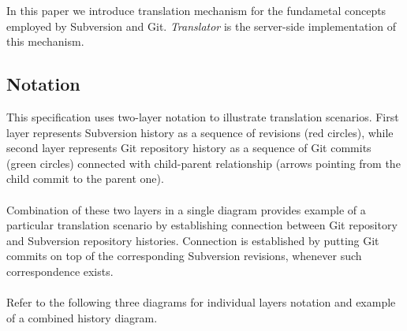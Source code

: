 \renewcommand{\figurename}{Diagram}
In this paper we introduce translation mechanism for the fundametal concepts employed by Subversion and Git.
\emph{Translator} is the server-side implementation of this mechanism.
\subsection{Notation}
This specification uses two-layer notation to illustrate translation scenarios. First layer represents 
Subversion history as a sequence of revisions (red circles), while second layer represents Git repository history 
as a sequence of Git commits (green circles) connected with child-parent relationship (arrows pointing from the child 
commit to the parent one). 
\\\\
Combination of these two layers in a single diagram provides example of a particular translation scenario by
establishing connection between Git repository and Subversion repository histories. Connection is established
by putting Git commits on top of the corresponding Subversion revisions, whenever such correspondence exists.
\\\\
Refer to the following three diagrams for individual layers notation and example of a combined history diagram.
